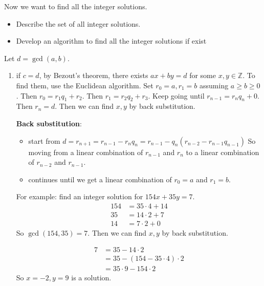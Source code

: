 \documentclass[letterpaper,12pt,oneside]{article}
\begin{document}
Now we want to find all the integer solutions.\begin{itemize}
    \item Describe the set of all integer solutions.
    \item Develop an algorithm to find all the integer solutions if exist
\end{itemize}

Let $d = \gcd(a,b)$. \begin{enumerate}
    \item if $c=d$, by Bezout's theorem, there exists $ax+by=d$ for some $x, y \in
              \mathbb{Z}$. To find them, use the Euclidean algorithm. Set $r_0 =a, r_1 = b$
          assuming $a \ge b \ge 0$. Then $r_0 = r_1q_1 + r_2$. Then $r_1 = r_2q_2 + r_3$.
          Keep going until $r_{n-1} = r_nq_n + 0$. Then $r_n = d$. Then we can find $x,
              y$ by back substitution.

          \textbf{Back substitution}: \begin{itemize}
              \item start from $d = r_{n+1}=r_{n-1}-r_nq_n=r_{n-1}-q_n(r_{n-2}-r_{n-1}q_{n-1})$ So
                    moving from a linear combination of $r_{n-1}$ and $r_n$ to a linear combination
                    of $r_{n-2}$ and $r_{n-1}$.
              \item continues until we get a linear combination of $r_0=a$ and $r_1=b$.
          \end{itemize}
          For example: find an integer solution for $154x+35y=7$. \begin{align*}
              154 & = 35 \cdot 4 + 14 \\
              35  & = 14 \cdot 2 + 7  \\
              14  & = 7 \cdot 2 + 0
          \end{align*}
          So $\gcd(154, 35) = 7$. Then we can find $x, y$ by back substitution.

          \begin{align*}
              7 & = 35 - 14 \cdot 2                 \\
                & = 35 - (154 - 35 \cdot 4) \cdot 2 \\
                & = 35 \cdot 9 - 154 \cdot 2
          \end{align*}
          So $x = -2, y = 9$ is a solution.


\end{enumerate}
\end{document}
